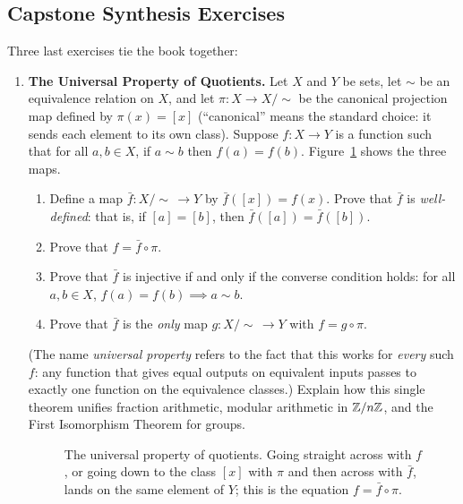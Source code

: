 \subsection{Capstone Synthesis Exercises}

Three last exercises tie the book together:

\begin{enumerate}[resume]
  \item \textbf{The Universal Property of Quotients.}
  Let $X$ and $Y$ be sets, let $\sim$ be an equivalence relation on $X$, and let $\pi: X \to X/\!\sim$ be the canonical projection map defined by $\pi(x) = [x]$ (``canonical'' means the standard choice: it sends each element to its own class). Suppose $f: X \to Y$ is a function such that for all $a, b \in X$, if $a \sim b$ then $f(a) = f(b)$. Figure~\ref{exam:fig-universal-property} shows the three maps.
  \begin{enumerate}
    \item Define a map $\bar{f}: X/\!\sim \, \to Y$ by $\bar{f}([x]) = f(x)$. Prove that $\bar{f}$ is \emph{well-defined}: that is, if $[a] = [b]$, then $\bar{f}([a]) = \bar{f}([b])$.
    \item Prove that $f = \bar{f} \circ \pi$.
    \item Prove that $\bar{f}$ is injective if and only if the converse condition holds: for all $a, b \in X$, $f(a) = f(b) \implies a \sim b$.
    \item Prove that $\bar{f}$ is the \emph{only} map $g: X/\!\sim \, \to Y$ with $f = g \circ \pi$.
  \end{enumerate}
  (The name \emph{universal property} refers to the fact that this works for \emph{every} such $f$: any function that gives equal outputs on equivalent inputs passes to exactly one function on the equivalence classes.)
  Explain how this single theorem unifies fraction arithmetic, modular arithmetic in $\mathbb{Z}/n\mathbb{Z}$, and the First Isomorphism Theorem for groups.

  \begin{figure}[htbp]
  \centering
  \caption{The universal property of quotients. Going straight across with $f$, or going down to the class $[x]$ with $\pi$ and then across with $\bar{f}$, lands on the same element of $Y$; this is the equation $f = \bar{f} \circ \pi$.}\label{exam:fig-universal-property}
  \end{figure}


\end{enumerate}
